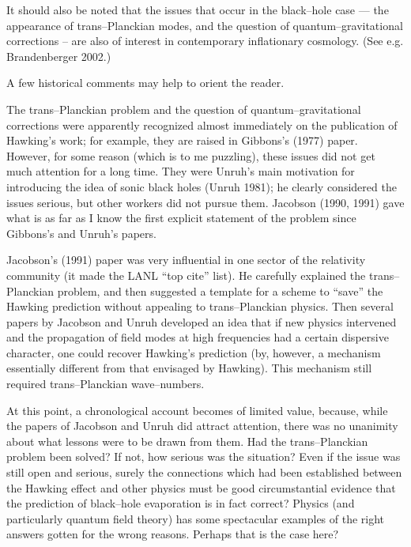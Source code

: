 It should also be noted that the issues that occur in the black--hole case ---
the appearance of trans--Planckian modes, and the question of
quantum--gravitational corrections -- are also of interest in contemporary
inflationary cosmology.  (See e.g. Brandenberger 2002.)

A few historical comments may help to orient the reader.

The trans--Planckian problem and the question of quantum--gravitational
corrections were apparently recognized almost immediately on the publication of
Hawking's work; for example, they are raised in Gibbons's (1977) paper. 
However, for some reason (which is to me puzzling), these issues did not get
much attention for a long time.   They were Unruh's main motivation for
introducing the idea of sonic black holes (Unruh 1981); he clearly
considered the issues serious, but other workers did not pursue them. Jacobson
(1990, 1991) gave what is as far as I know the first explicit statement of the
problem since Gibbons's and Unruh's papers.  

Jacobson's (1991)  paper was very influential in one sector of the relativity
community (it made the LANL ``top cite'' list).  He carefully explained the
trans--Planckian problem, and then suggested a template for a scheme to
``save'' the Hawking prediction without appealing to trans--Planckian physics. 
Then several papers by Jacobson and Unruh developed an idea that if new physics
intervened and the propagation of field modes at high frequencies had a certain
dispersive character, one could recover Hawking's prediction (by, however, a
mechanism essentially different from that envisaged by Hawking).  This
mechanism still required trans--Planckian wave--numbers.  

At this point, a chronological account becomes of limited value, because, while
the papers of Jacobson and Unruh did attract attention, there was no unanimity
about what lessons were to be drawn from them.  Had the trans--Planckian problem
been solved?  If not, how serious was the situation?  Even if the issue was
still open and serious, surely the connections which had been established
between the Hawking effect and other physics must be good circumstantial
evidence that the prediction of black--hole evaporation is in fact correct?  
Physics (and particularly quantum field
theory) has some spectacular examples of the right answers gotten for
the wrong reasons.  Perhaps that is the case here?


